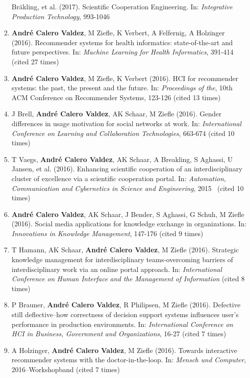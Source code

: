 \documentclass[11pt,a4paper,sans]{moderncv}
\begin{document}
\begin{enumerate}
  Bräkling, et al. (2017). Scientific Cooperation Engineering. In:
  \emph{Integrative Production Technology}, 993-1046
\item
  \textbf{André Calero Valdez}, M Ziefle, K Verbert, A Felfernig, A
  Holzinger (2016). Recommender systems for health informatics:
  state-of-the-art and future perspectives. In: \emph{Machine Learning
  for Health Informatics}, 391-414 (cited 27 times)
\item
  \textbf{André Calero Valdez}, M Ziefle, K Verbert (2016). HCI for
  recommender systems: the past, the present and the future. In:
  \emph{Proceedings of the}, 10th ACM Conference on Recommender Systems,
  123-126 (cited 13 times)
\item
  J Brell, \textbf{André Calero Valdez}, AK Schaar, M Ziefle (2016).
  Gender differences in usage motivation for social networks at work.
  In: \emph{International Conference on Learning and Collaboration
  Technologies}, 663-674 (cited 10 times)
\item
  T Vaegs, \textbf{André Calero Valdez}, AK Schaar, A Breakling, S
  Aghassi, U Jansen, et al. (2016). Enhancing scientific cooperation of
  an interdisciplinary cluster of excellence via a scientific
  cooperation portal. In: \emph{Automation, Communication and
  Cybernetics in Science and Engineering}, 2015~ (cited 10 times)
\item
  \textbf{André Calero Valdez}, AK Schaar, J Bender, S Aghassi, G Schuh,
  M Ziefle (2016). Social media applications for knowledge exchange in
  organizations. In: \emph{Innovations in Knowledge Management}, 147-176
  (cited 9 times)
\item
  T Hamann, AK Schaar, \textbf{André Calero Valdez}, M Ziefle (2016).
  Strategic knowledge management for interdisciplinary teams-overcoming
  barriers of interdisciplinary work via an online portal approach. In:
  \emph{International Conference on Human Interface and the Management
  of Information} (cited 8 times)
\item
  P Brauner, \textbf{André Calero Valdez}, R Philipsen, M Ziefle (2016).
  Defective still deflective--how correctness of decision support
  systems influences user's performance in production environments. In:
  \emph{International Conference on HCI in Business, Government and
  Organizations}, 16-27 (cited 7 times)
\item
  A Holzinger, \textbf{André Calero Valdez}, M Ziefle (2016). Towards
  interactive recommender systems with the doctor-in-the-loop. In:
  \emph{Mensch und Computer}, 2016--Workshopband (cited 7 times)

\end{enumerate}
\end{document}
